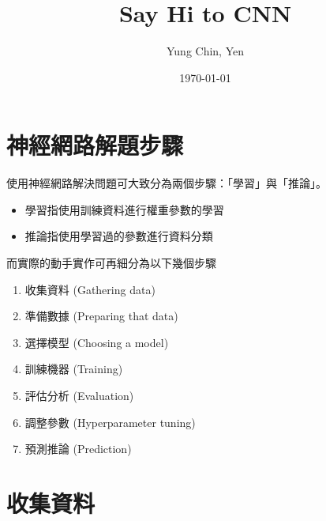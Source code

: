 \documentclass[a4paper,12pt]{article}
\author{Yung Chin, Yen}
\date{\today}
\title{Say Hi to CNN}
\begin{document}
\maketitle
\tableofcontents


\section{神經網路解題步驟}
\label{sec:org82d0fdf}
使用神經網路解決問題可大致分為兩個步驟：「學習」與「推論」。\\
\begin{itemize}
\item 學習指使用訓練資料進行權重參數的學習\\
\item 推論指使用學習過的參數進行資料分類\\
\end{itemize}
而實際的動手實作可再細分為以下幾個步驟\\
\begin{enumerate}
\item 收集資料 (Gathering data)\\
\item 準備數據 (Preparing that data)\\
\item 選擇模型 (Choosing a model)\\
\item 訓練機器 (Training)\\
\item 評估分析 (Evaluation)\\
\item 調整參數 (Hyperparameter tuning)\\
\item 預測推論 (Prediction)\\
\end{enumerate}
\newpage

\section{收集資料}
\label{sec:orgbcd5231}
\end{document}
